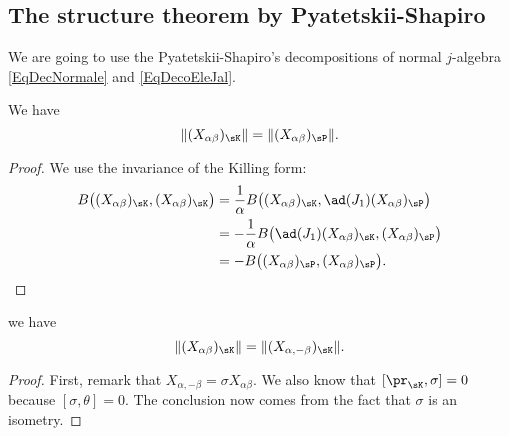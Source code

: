 \subsection{The structure theorem by Pyatetskii-Shapiro}

We are going to use the  Pyatetskii-Shapiro's decompositions of normal $j$-algebra \eqref{EqDecNormale} and \eqref{EqDecoEleJal}. 

\begin{lemma}
	We have
	\begin{equation}
		\| (X_{\alpha\beta})_{\sK} \|=\| (X_{\alpha\beta})_{\sP} \|.
	\end{equation}
\end{lemma}

\begin{proof}
	We use the invariance of the Killing form:
	\begin{equation}
		\begin{aligned}[]
			B\big( (X_{\alpha\beta})_{\sK},(X_{\alpha\beta})_{\sK} \big)&=\frac{1}{ \alpha }B\big( (X_{\alpha\beta})_{\sK},\ad(J_1)(X_{\alpha\beta})_{\sP} \big)\\
			&=-\frac{1}{ \alpha }B\big( \ad(J_1)(X_{\alpha\beta})_{\sK},(X_{\alpha\beta})_{\sP} \big)\\
				&=-B\big( (X_{\alpha\beta})_{\sP},(X_{\alpha\beta})_{\sP} \big).
		\end{aligned}
	\end{equation}
\end{proof}

\begin{lemma}
	we have
	\begin{equation}
		\| (X_{\alpha\beta})_{\sK} \|=\| (X_{\alpha,-\beta})_{\sK} \|.
	\end{equation}
\end{lemma}

\begin{proof}
	First, remark that $X_{\alpha,-\beta}=\sigma X_{\alpha\beta}$. We also know that $[\pr_{\sK},\sigma]=0$ because $[\sigma,\theta]=0$. The conclusion now comes from the fact that $\sigma$ is an isometry.
\end{proof}


